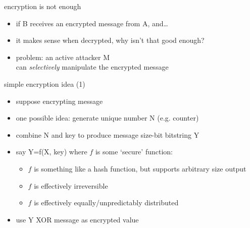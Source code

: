 \begin{frame}{encryption is not enough}
    \begin{itemize}
    \item if B receives an encrypted message from A, and\ldots
    \item it makes sense when decrypted, why isn't that good enough?
    \vspace{.5cm}
    \item problem: an active attacker M \\
        can \textit{selectively} manipulate the encrypted message
    \end{itemize}
\end{frame}

\begin{frame}{simple encryption idea (1)}
    \begin{itemize}
    \item suppose encrypting message
    \item one possible idea: generate unique number N (e.g. counter)
    \item combine N and key to produce message size-bit bitstring Y
    \item say Y=f(X, key) where $f$ is some `secure' function:
        \begin{itemize}
        \item $f$ is something like a hash function, but supports arbitrary size output
        \item $f$ is effectively irreversible
        \item $f$ is effectively equally/unpredictably distributed
        \end{itemize}
    \item use Y XOR message as encrypted value
    \end{itemize}
\end{frame}

